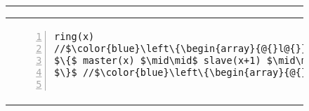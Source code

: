 
\begin{figure}
\centering
\noindent\hrule\vspace{10pt}
\vspace{-3ex}
\begin{tabular}{@{} l @{\hspace{2ex}} l@{}}
{\begin{lstlisting}[numbers=left,numbersep=5pt]
ring(x)
//$\color{blue}\left\{\begin{array}{@{}l@{}}\tx{x}|-< x * [\token m_{x}] * [\token s_{x{+}1}] * [\token s_{x{+}2}]*\null\\ \shared{\begin{array}{@{}l@{}}\tx{n}|-<n * x|->0 * x{+}1|->0 * x{+}2|->0\end{array}}{I}\end{array} \right\}$
$\{$ master(x) $\mid\mid$ slave(x+1) $\mid\mid$ slave(x+2);
$\}$ //$\color{blue}\left\{\begin{array}{@{}l@{}}\tx{x}|-< x * [\token m_{x}] * [\token s_{x{+}1}] * [\token s_{x{+}2}]*\null\\ \shared{\begin{array}{@{}l@{}}\tx{n}|-<n * x|->10 * x{+}1|->10 * x{+}2|->10\end{array}}{I}\end{array} \right\}$


\end{lstlisting}}
\end{tabular}
\end{figure}

